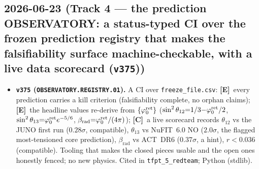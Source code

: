 \documentclass[11pt]{article}
\providecommand{\mE}{\textbf{[E]}}\providecommand{\mC}{\textbf{[C]}}
\begin{document}
\subsection*{2026-06-23 (Track 4 --- the prediction OBSERVATORY: a status-typed CI over the frozen prediction registry that makes the falsifiability surface machine-checkable, with a live data scorecard (\texttt{v375}))}
\begin{itemize}
\item \textbf{\texttt{v375} (\texttt{OBSERVATORY.REGISTRY.01}).} A CI over \texttt{freeze\_file.csv}: \mE\ every
prediction carries a kill criterion (falsifiability complete, no orphan claims); \mE\ the headline values
re-derive from $\{\varphi_0^{\mathrm{ret}}\}$ ($\sin^2\theta_{12}{=}1/3{-}\varphi_0^{\mathrm{ret}}/2$, $\sin^2\theta_{13}{=}\varphi_0^{\mathrm{ret}} e^{-5/6}$,
$\beta_{\mathrm{rad}}{=}\varphi_0^{\mathrm{ret}}/(4\pi)$); \mC\ a live scorecard records $\theta_{12}$ vs the JUNO first run
($0.28\sigma$, compatible), $\theta_{13}$ vs NuFIT~6.0 NO ($2.0\sigma$, the flagged most-tensioned core
prediction), $\beta_{\mathrm{rad}}$ vs ACT~DR6 ($0.37\sigma$, a hint), $r<0.036$ (compatible). Tooling that
makes the closed pieces usable and the open ones honestly fenced; no new physics. Cited in
\texttt{tfpt\_5\_redteam}; Python (stdlib).
\end{itemize}
\end{document}
